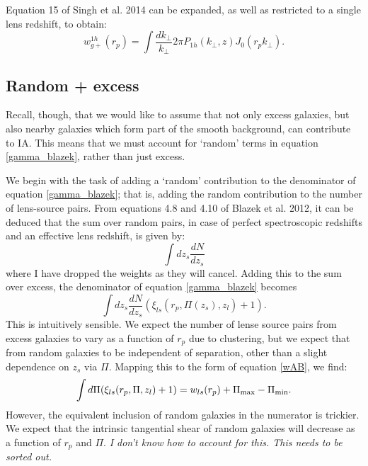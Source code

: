 \documentclass[onecolumn,amsmath,aps,fleqn, superscriptaddress]{revtex4}
\begin{document}
Equation 15 of Singh et al. 2014 can be expanded, as well as restricted to a single lens redshift, to obtain:
\begin{equation}
w_{g+}^{1h}(r_p) = \int \frac{dk_\perp}{k_\perp}{2\pi} P_{1h}(k_\perp,z) J_0(r_p k_\perp).
\label{wg1h}
\end{equation}

\subsection*{Random + excess}
Recall, though, that we would like to assume that not only excess galaxies, but also nearby galaxies which form part of the smooth background, can contribute to IA. This means that we must account for `random' terms in equation \ref{gamma_blazek}, rather than just excess.

We begin with the task of adding a `random' contribution to the denominator of equation \ref{gamma_blazek}; that is, adding the random contribution to the number of lens-source pairs. From equations 4.8 and 4.10 of Blazek et al. 2012, it can be deduced that the sum over random pairs, in case of perfect spectroscopic redshifts and an effective lens redshift, is given by:
\begin{equation}
\int dz_s \frac{dN}{dz_s} 
\end{equation}
where I have dropped the weights as they will cancel. Adding this to the sum over excess, the denominator of equation \ref{gamma_blazek} becomes
\begin{equation}
\int dz_s \frac{dN}{dz_s} \left(\xi_{ls}(r_p, \Pi(z_s), z_l) + 1\right).
\label{denom_rand}
\end{equation}
This is intuitively sensible. We expect the number of lense source pairs from excess galaxies to vary as a function of $r_p$ due to clustering, but we expect that from random galaxies to be independent of separation, other than a slight dependence on $z_s$ via $\Pi$. Mapping this to the form of equation \ref{wAB}, we find:
\begin{equation}
\int d\Pi (\xi_{ls}(r_p, \Pi, z_l) + 1) = w_{ls}(r_p) + \Pi_{\rm max} - \Pi_{\rm min}.
\label{wl}
\end{equation}
However, the equivalent inclusion of random galaxies in the numerator is trickier. We expect that the intrinsic tangential shear of random galaxies will decrease as a function of $r_p$ and $\Pi$. {\it I don't know how to account for this. This needs to be sorted out.}
\end{document}
